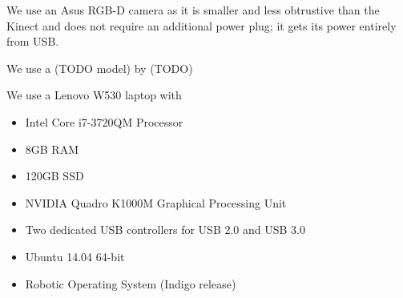 We use an Asus RGB-D camera as it is smaller and less obtrustive than the Kinect
and does not require an additional power plug; it gets its power entirely from
USB.


We use a (TODO model) by (TODO) 

We use a Lenovo W530 laptop with 
\begin{itemize}
\item Intel Core i7-3720QM Processor
\item 8GB RAM
\item 120GB SSD
\item NVIDIA Quadro K1000M Graphical Processing Unit
\item Two dedicated USB controllers for USB 2.0 and USB 3.0
\item Ubuntu 14.04 64-bit
\item Robotic Operating System (Indigo release)
\end{itemize}


\endinput
Any text after an \endinput is ignored.

\section{Summary of Thesis}
\subsection{One sentence summary}
We introduce an autonomous back-in parking system for powered wheelchairs
equipped with an RGB-D sensor, that finds a suitable place to park in a room
without any marked parking spots.

\subsection{One paragraph summary}
We address the problem: Where

\subsection{Five minute read summary}

\paragraph{What is this?} A collection of research ideas.

\paragraph{Who's it for?} Me.

TODO use this \cite{viswanathan2011navigation}
